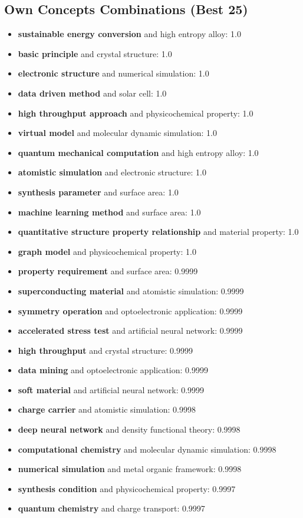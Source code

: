 \documentclass{article}%
\begin{document}
\subsection{Own Concepts Combinations (Best 25)}%
\label{subsec:OwnConceptsCombinations(Best25)}%
\begin{itemize}%
\item%
\textbf{sustainable energy conversion} and high entropy alloy: 1.0%
\item%
\textbf{basic principle} and crystal structure: 1.0%
\item%
\textbf{electronic structure} and numerical simulation: 1.0%
\item%
\textbf{data driven method} and solar cell: 1.0%
\item%
\textbf{high throughput approach} and physicochemical property: 1.0%
\item%
\textbf{virtual model} and molecular dynamic simulation: 1.0%
\item%
\textbf{quantum mechanical computation} and high entropy alloy: 1.0%
\item%
\textbf{atomistic simulation} and electronic structure: 1.0%
\item%
\textbf{synthesis parameter} and surface area: 1.0%
\item%
\textbf{machine learning method} and surface area: 1.0%
\item%
\textbf{quantitative structure property relationship} and material property: 1.0%
\item%
\textbf{graph model} and physicochemical property: 1.0%
\item%
\textbf{property requirement} and surface area: 0.9999%
\item%
\textbf{superconducting material} and atomistic simulation: 0.9999%
\item%
\textbf{symmetry operation} and optoelectronic application: 0.9999%
\item%
\textbf{accelerated stress test} and artificial neural network: 0.9999%
\item%
\textbf{high throughput} and crystal structure: 0.9999%
\item%
\textbf{data mining} and optoelectronic application: 0.9999%
\item%
\textbf{soft material} and artificial neural network: 0.9999%
\item%
\textbf{charge carrier} and atomistic simulation: 0.9998%
\item%
\textbf{deep neural network} and density functional theory: 0.9998%
\item%
\textbf{computational chemistry} and molecular dynamic simulation: 0.9998%
\item%
\textbf{numerical simulation} and metal organic framework: 0.9998%
\item%
\textbf{synthesis condition} and physicochemical property: 0.9997%
\item%
\textbf{quantum chemistry} and charge transport: 0.9997%
\end{itemize}
\end{document}
